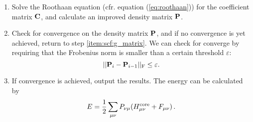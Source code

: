\documentclass[12pt]{article}
\begin{document}
\begin{enumerate}
        \item Solve the Roothaan equation (cfr. equation (\ref{eq:roothaan})) for the coefficient matrix $\vb{C}$, and calculate an improved density matrix $\vb{P}$.

        \item Check for convergence on the density matrix $\vb{P}$, and if no convergence is yet achieved, return to step \ref{item:scf:g_matrix}. We can check for converge by requiring that the Frobenius norm is smaller than a certain threshold $\varepsilon$:
        \begin{equation}
            ||\vb{P}_i - \vb{P}_{i-1}||_\text{F} \leq \varepsilon .
        \end{equation}

        \item If convergence is achieved, output the results. The energy can be calculated by
        \begin{equation}
            E = \frac{1}{2} \sum_{\mu \nu} P_{\nu \mu} (H^\text{core}_{\mu \nu} + F_{\mu \nu}) \thinspace .
        \end{equation}
    \end{enumerate}






\end{document}
